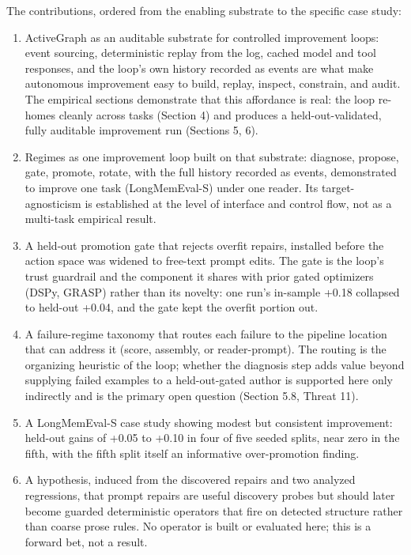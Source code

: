 The contributions, ordered from the enabling substrate to the specific case study:
\begin{enumerate}
\item ActiveGraph as an auditable substrate for controlled improvement loops: event sourcing, deterministic replay from the log, cached model and tool responses, and the loop's own history recorded as events are what make autonomous improvement easy to build, replay, inspect, constrain, and audit. The empirical sections demonstrate that this affordance is real: the loop re-homes cleanly across tasks (Section 4) and produces a held-out-validated, fully auditable improvement run (Sections 5, 6).
\item Regimes as one improvement loop built on that substrate: diagnose, propose, gate, promote, rotate, with the full history recorded as events, demonstrated to improve one task (LongMemEval-S) under one reader. Its target-agnosticism is established at the level of interface and control flow, not as a multi-task empirical result.
\item A held-out promotion gate that rejects overfit repairs, installed before the action space was widened to free-text prompt edits. The gate is the loop's trust guardrail and the component it shares with prior gated optimizers (DSPy, GRASP) rather than its novelty: one run's in-sample +0.18 collapsed to held-out +0.04, and the gate kept the overfit portion out.
\item A failure-regime taxonomy that routes each failure to the pipeline location that can address it (score, assembly, or reader-prompt). The routing is the organizing heuristic of the loop; whether the diagnosis step adds value beyond supplying failed examples to a held-out-gated author is supported here only indirectly and is the primary open question (Section 5.8, Threat 11).
\item A LongMemEval-S case study showing modest but consistent improvement: held-out gains of +0.05 to +0.10 in four of five seeded splits, near zero in the fifth, with the fifth split itself an informative over-promotion finding.
\item A hypothesis, induced from the discovered repairs and two analyzed regressions, that prompt repairs are useful discovery probes but should later become guarded deterministic operators that fire on detected structure rather than coarse prose rules. No operator is built or evaluated here; this is a forward bet, not a result.
\end{enumerate}


